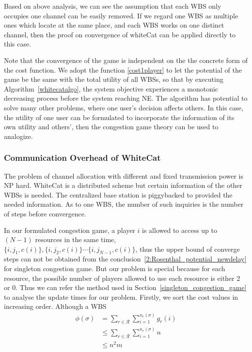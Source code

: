 Based on above analysis, we can see the assumption that each WBS only occupies one channel can be easily removed.
If we regard one WBS as multiple ones which locate at the same place, and each WBS works on one distinct channel, then the proof on convergence of whiteCat can be applied directly to this case.

Note that the convergence of the game is independent on the the concrete form of the cost function. 
We adopt the function \ref{cost1player} to let the potential of the game be the same with the total utility of all WBSs, so that by executing Algorithm~\ref{whitecatalgo}, the system objective experiences a monotonic decreasing process before the system reaching NE.
The algorithm has potential to solve many other problems, where one user's decision affects others.
In this case, the utility of one user can be formulated to incorporate the information of its own utility and others', then the congestion game theory can be used to analogize.



\subsubsection*{Communication Overhead of WhiteCat}

The problem of channel allocation with different and fixed transmission power is NP hard.
WhiteCat is a distributed scheme but certain information of the other WBSs is needed.
The centralized base station is piggybacked to provided the needed information.
As to one WBS, the number of such inquiries is the number of steps before convergence.

In our formulated congestion game, a player $i$ is allowed to access up to $(N-1)$ resources in the same time, \ie $\{i, j_1, c(i)\}, \{i, j_2, c(i)\} \cdots \{i, j_{N-1}, c(i)\}$, thus the upper bound of converge steps can not be obtained from the conclusion~\ref{2:Rosenthal_potential_newdelay} for singleton congestion game.
But our problem is special because for each resource, the possible number of players allowed to use each resource is either 2 or 0.
Thus we can refer the method used in Section~\ref{singleton_congestion_game} to analyse the update times for our problem.
Firstly, we sort the cost values in increasing order.
Although a WBS 
\begin{equation}
\label{2:Rosenthal_potential_newdelay}
\begin{split}
\phi(\sigma) 
& =\sum\limits^{}_{r\in \mathcal{R}} \sum\limits^{n_r(\sigma)}_{i=1} g_r(i)\\
& \leq \sum\limits^{}_{r\in \mathcal{R}} \sum\limits^{n_r(\sigma)}_{i=1} n\\
& \leq n^2m
\end{split}
\end{equation}


